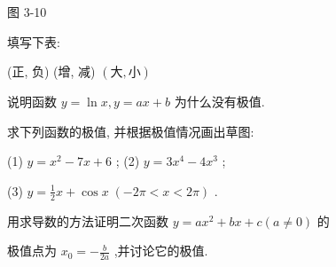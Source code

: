 \documentclass[lang=cn,newtx,12pt,scheme=chinese]{elegantbook}
\begin{document}
图 3-10

\begin{problemset}[练习]

\item 填写下表:

\begin{center}
\end{center}

(正, 负) (增, 减) \(\left( {大,小}\right)\)

\item 说明函数 \(y = \ln x,y = {ax} + b\) 为什么没有极值.

\item 求下列函数的极值, 并根据极值情况画出草图:

(1) \(y = {x}^{2} - {7x} + 6\) ; (2) \(y = 3{x}^{4} - 4{x}^{3}\) ;

(3) \(y = \frac{1}{2}x + \cos x\;\left( {-{2\pi } < x < {2\pi }}\right)\) .

\item 用求导数的方法证明二次函数 \(y = a{x}^{2} + {bx} + c\left( {a \neq 0}\right)\) 的

极值点为 \({x}_{0} = - \frac{b}{2a}\) ,并讨论它的极值.

\end{problemset}
\end{document}
